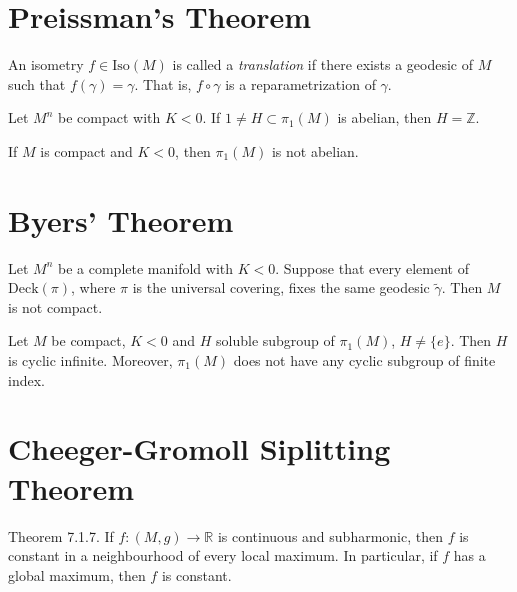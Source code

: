 \section{Preissman's Theorem}
\label{section-Preissman-theorem}

\begin{definition}
\label{definition-translation}
An isometry $f \in \text{Iso}(M)$ is called a
{\it translation} if there exists
a geodesic of $M$ such that
$f(\gamma)=\gamma$. That is, $f \circ \gamma$
is a
reparametrization of $\gamma$.
\end{definition}

\begin{theorem}[Preissman]
\label{theorem-Preissman}
Let $M^n$ be compact with $K<0$. If $1 \neq
H \subset \pi_1(M)$ is abelian,
then $H=\mathbb{Z}$.
\end{theorem}

\begin{theorem}[Preissman]
\label{theorem-m-compa-k-negat-then-pi1}
If $M$ is compact and $K<0$, then
$\pi_{1}(M)$ is not abelian.
\end{theorem}

\section{Byers' Theorem}
\label{section-Byers-theorem}

\begin{lemma}
\label{lemma-deck-fixes-geode-then-not}
Let $M^n$ be a complete manifold with $K<0$.
Suppose that every element of
$\text{Deck}(\pi)$, where $\pi$ is the
universal covering, fixes the same
 geodesic $\tilde{\gamma}$. Then $M$ is not
 compact.
\end{lemma}

\begin{theorem}[Byers]
\label{theorem-Byers}
Let $M$ be compact, $K<0$ and $H$ soluble
subgroup of $\pi_1(M)$, $H\neq \{e\}$.
Then $H$ is cyclic infinite. Moreover,
$\pi_1(M)$ does not have any cyclic
subgroup of finite index.
\end{theorem}

\section{Cheeger-Gromoll Siplitting Theorem}
\label{section-chegg-gromo-split-theor}

\begin{theorem}
\label{theorem-strong-maximum-principle}
\cite{pet} Theorem 7.1.7. If $f:(M,g) \to
\mathbb{R}$ is continuous and
subharmonic, then $f$ is constant in a
neighbourhood of every local maximum. In
particular, if $f$ has a global maximum, then
$f$ is constant.
\end{theorem}

